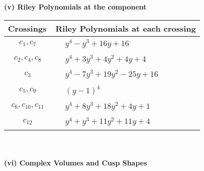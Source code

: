 \documentclass[1p]{elsarticle_modified}
\theoremstyle{definition}
\begin{document}
\newpage\renewcommand{\arraystretch}{1}
\flushleft \textbf{(v) Riley Polynomials at the component}\newline \\
\begin{tabular}{m{50pt}|m{274pt}}
Crossings & \hspace{64pt}Riley Polynomials at each crossing \\
\hline $$\begin{aligned}c_{1},c_{7}\end{aligned}$$&$\begin{aligned}
&y^4- y^3+16 y+16
\end{aligned}$\\
\hline $$\begin{aligned}c_{2},c_{4},c_{8}\end{aligned}$$&$\begin{aligned}
&y^4+3 y^3+4 y^2+4 y+4
\end{aligned}$\\
\hline $$\begin{aligned}c_{3}\end{aligned}$$&$\begin{aligned}
&y^4-7 y^3+19 y^2-25 y+16
\end{aligned}$\\
\hline $$\begin{aligned}c_{5},c_{9}\end{aligned}$$&$\begin{aligned}
&(y-1)^4
\end{aligned}$\\
\hline $$\begin{aligned}c_{6},c_{10},c_{11}\end{aligned}$$&$\begin{aligned}
&y^4+8 y^3+18 y^2+4 y+1
\end{aligned}$\\
\hline $$\begin{aligned}c_{12}\end{aligned}$$&$\begin{aligned}
&y^4+y^3+11 y^2+11 y+4
\end{aligned}$\\
\hline
\end{tabular}\\~\\
\newpage\flushleft \textbf{(vi) Complex Volumes and Cusp Shapes}
\end{document}
